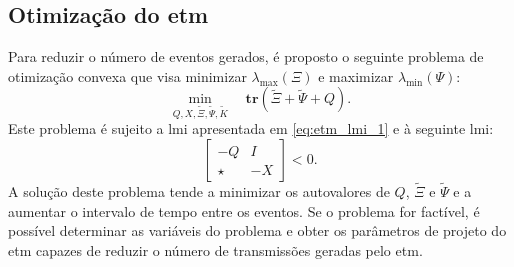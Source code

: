\subsection{Otimização do \acrshort{etm}}


Para reduzir o número de eventos gerados, é proposto o seguinte problema de otimização convexa que visa minimizar $\lambda_{\max} (\Xi)$ e maximizar $\lambda_{\min}(\Psi)$: \begin{equation}\underset{Q, X, \tilde{\Xi}, \tilde{\Psi}, \tilde{K}}\min \quad \mathbf{tr}(\tilde{\Xi} + \tilde{\Psi} + Q). \label{eq:optimization_problem}\end{equation} Este problema é sujeito a \acrshort{lmi} apresentada em \eqref{eq:etm_lmi_1} e à seguinte \acrshort{lmi}: \begin{equation}\begin{bmatrix}
  -Q & I \\ \star & -X
\end{bmatrix} < 0. \label{eq:constraints_2}\end{equation} A solução deste problema tende a minimizar os autovalores de $Q$, $\tilde{\Xi}$ e $\tilde{\Psi}$ e a aumentar o intervalo de tempo entre os eventos. Se o problema for factível, é possível determinar as variáveis do problema e obter os parâmetros de projeto do \acrshort{etm} capazes de reduzir o número de transmissões geradas pelo \acrshort{etm}.